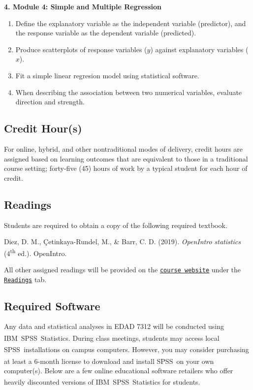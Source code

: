 \documentclass[
]{article}
\providecommand{\tightlist}{%
  \setlength{\itemsep}{0pt}\setlength{\parskip}{0pt}}
\begin{document}
\textbf{4. Module 4: Simple and Multiple Regression}

\begin{enumerate}
\def\labelenumi{\arabic{enumi}.}
\tightlist
\item
  Define the explanatory variable as the independent variable
  (predictor), and the response variable as the dependent variable
  (predicted).
\item
  Produce scatterplots of response variables (\(y\)) against explanatory
  variables (\(x\)).
\item
  Fit a simple linear regresion model using statistical software.
\item
  When describing the association between two numerical variables,
  evaluate direction and strength.
\end{enumerate}

\subsection{Credit Hour(s)}

For online, hybrid, and other nontraditional modes of delivery, credit
hours are assigned based on learning outcomes that are equivalent to
those in a traditional course setting; forty-five (45) hours of work by
a typical student for each hour of credit.

\subsection{Readings}

Students are required to obtain a copy of the following required
textbook.

\begin{hangparas}{.4in}{1}
Diez, D. M.,  \c{C}etinkaya-Rundel, M., \& Barr, C. D. (2019).  {\em{OpenIntro statistics}} (4\textsuperscript{th} ed.).  OpenIntro.
\end{hangparas}

All other assigned readings will be provided on the
\texttt{\href{https://mycourses.umhb.edu/courses/23599}{course website}}
under the
\texttt{\href{https://mycourses.umhb.edu/courses/23599/files/folder/Readings}{Readings}}
tab.

\subsection{Required Software}

Any data and statistical analyses in EDAD 7312 will be conducted using
IBM\textsuperscript{\textregistered}~SPSS\textsuperscript{\textregistered}~Statistics.
During class meetings, students may access local
SPSS\textsuperscript{\textregistered}~installations on campus computers.
However, you may consider purchasing at least a 6-month license to
download and install SPSS\textsuperscript{\textregistered}~on your own
computer(s). Below are a few online educational software retailers who
offer heavily discounted versions of
IBM\textsuperscript{\textregistered}~SPSS\textsuperscript{\textregistered}~Statistics
for students.
\end{document}
